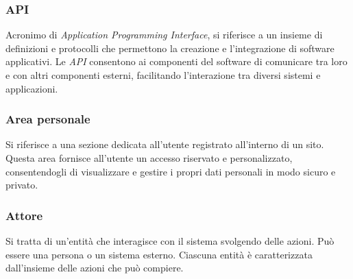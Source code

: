 
\subsubsection*{API}
Acronimo di \textit{Application Programming Interface}, si riferisce a un 
insieme di definizioni e protocolli che permettono la creazione e l'integrazione di software applicativi.
Le \textit{API} consentono ai componenti del software di comunicare tra loro e con altri componenti esterni, 
facilitando l'interazione tra diversi sistemi e applicazioni.

\subsubsection*{Area personale}
Si riferisce a una sezione dedicata all'utente registrato all'interno di un sito. 
Questa area fornisce all'utente un accesso riservato e personalizzato, consentendogli di visualizzare e gestire i propri dati personali in modo sicuro e privato. 

\subsubsection*{Attore}
Si tratta di un'entità che interagisce con il sistema svolgendo delle azioni.
Può essere una persona o un sistema esterno. Ciascuna entità è caratterizzata
dall'insieme delle azioni che può compiere.

\newpage
